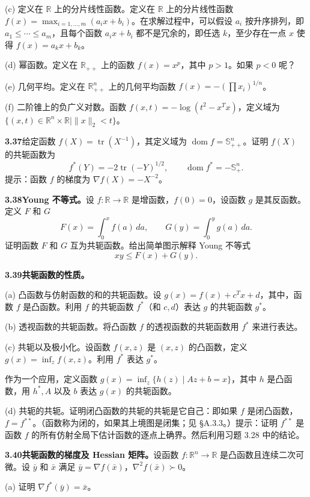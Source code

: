 \documentclass[UTF8,12pt,a4paper,fontset=fandol]{ctexart}
\DeclareMathOperator{\dom}{dom}
\begin{document}
(c) 定义在 $\mathbb{R}$ 上的分片线性函数。定义在 $\mathbb{R}$ 上的分片线性函数 $f(x)=\max_{i=1,\ldots,m}(a_ix+b_i)$。在求解过程中，可以假设 $a_i$ 按升序排列，即 $a_1\leq\cdots\leq a_m$，且每个函数 $a_ix+b_i$ 都不是冗余的，即任选 $k$，至少存在一点 $x$ 使得 $f(x)=a_kx+b_k$。

(d) 幂函数。定义在 $\mathbb{R}_{++}$ 上的函数 $f(x)=x^p$，其中 $p>1$。如果 $p<0$ 呢？

(e) 几何平均。定义在 $\mathbb{R}_{++}^n$ 上的几何平均函数 $f(x)=-(\prod x_i)^{1/n}$。

(f) 二阶锥上的负广义对数。函数 $f(x,t)=-\log(t^2-x^Tx)$，定义域为 $\{(x,t)\in\mathbb{R}^n\times\mathbb{R}\mid \|x\|_2<t\}$。

\noindent\textbf{3.37}\quad 给定函数 $f(X)=\operatorname{tr}(X^{-1})$，其定义域为 $\dom f=\mathbb{S}_{++}^n$。证明 $f(X)$ 的共轭函数为
\[
f^*(Y)=-2\operatorname{tr}(-Y)^{1/2},\qquad \dom f^*=-\mathbb{S}_+^n.
\]
提示：函数 $f$ 的梯度为 $\nabla f(X)=-X^{-2}$。

\noindent\textbf{3.38\quad Young 不等式。}\quad 设 $f:\mathbb{R}\to\mathbb{R}$ 是增函数，$f(0)=0$，设函数 $g$ 是其反函数。定义 $F$ 和 $G$
\[
F(x)=\int_0^x f(a)\,da,\qquad
G(y)=\int_0^y g(a)\,da.
\]
证明函数 $F$ 和 $G$ 互为共轭函数。给出简单图示解释 Young 不等式
\[
xy\leq F(x)+G(y).
\]

\noindent\textbf{3.39\quad 共轭函数的性质。}

(a) 凸函数与仿射函数的和的共轭函数。设 $g(x)=f(x)+c^Tx+d$，其中，函数 $f$ 是凸函数。利用 $f$ 的共轭函数 $f^*$（和 $c,d$）表达 $g$ 的共轭函数 $g^*$。

(b) 透视函数的共轭函数。将凸函数 $f$ 的透视函数的共轭函数用 $f^*$ 来进行表达。

(c) 共轭以及极小化。设函数 $f(x,z)$ 是 $(x,z)$ 的凸函数，定义 $g(x)=\inf_z f(x,z)$。利用 $f^*$ 表达 $g^*$。

作为一个应用，定义函数 $g(x)=\inf_z\{h(z)\mid Az+b=x\}$，其中 $h$ 是凸函数，用 $h^*,A$ 以及 $b$ 表达 $g(x)$ 的共轭函数。

(d) 共轭的共轭。证明闭凸函数的共轭的共轭是它自己：即如果 $f$ 是闭凸函数，$f=f^{**}$。（函数称为闭的，如果其上境图是闭集；见 \S A.3.3。）提示：证明 $f^{**}$ 是函数 $f$ 的所有仿射全局下估计函数的逐点上确界。然后利用习题 3.28 中的结论。

\noindent\textbf{3.40\quad 共轭函数的梯度及 Hessian 矩阵。}\quad 设函数 $f:\mathbb{R}^n\to\mathbb{R}$ 是凸函数且连续二次可微。设 $\bar y$ 和 $\bar x$ 满足 $\bar y=\nabla f(\bar x)$，$\nabla^2 f(\bar x)\succ0$。

(a) 证明 $\nabla f^*(\bar y)=\bar x$。
\end{document}
